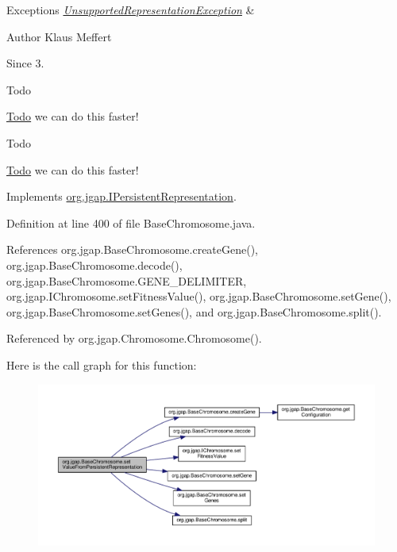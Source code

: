 \begin{DoxyExceptions}{Exceptions}
{\em \hyperlink{classorg_1_1jgap_1_1_unsupported_representation_exception}{Unsupported\-Representation\-Exception}} & \\
\hline
\end{DoxyExceptions}
\begin{DoxyAuthor}{Author}
Klaus Meffert 
\end{DoxyAuthor}
\begin{DoxySince}{Since}
3. 
\end{DoxySince}
\begin{DoxyRefDesc}{Todo}
\item[\hyperlink{todo__todo000039}{Todo}]we can do this faster! \end{DoxyRefDesc}


\begin{DoxyRefDesc}{Todo}
\item[\hyperlink{todo__todo000040}{Todo}]we can do this faster! \end{DoxyRefDesc}


Implements \hyperlink{interfaceorg_1_1jgap_1_1_i_persistent_representation_a94a345f1919c4840dd0b9eecf7afc6a3}{org.\-jgap.\-I\-Persistent\-Representation}.



Definition at line 400 of file Base\-Chromosome.\-java.



References org.\-jgap.\-Base\-Chromosome.\-create\-Gene(), org.\-jgap.\-Base\-Chromosome.\-decode(), org.\-jgap.\-Base\-Chromosome.\-G\-E\-N\-E\-\_\-\-D\-E\-L\-I\-M\-I\-T\-E\-R, org.\-jgap.\-I\-Chromosome.\-set\-Fitness\-Value(), org.\-jgap.\-Base\-Chromosome.\-set\-Gene(), org.\-jgap.\-Base\-Chromosome.\-set\-Genes(), and org.\-jgap.\-Base\-Chromosome.\-split().



Referenced by org.\-jgap.\-Chromosome.\-Chromosome().



Here is the call graph for this function\-:
\nopagebreak
\begin{figure}[H]
\begin{center}
\leavevmode
\includegraphics[width=350pt]{classorg_1_1jgap_1_1_base_chromosome_a30276dc8afb0bd632c288bf7d2e18b55_cgraph}
\end{center}
\end{figure}


